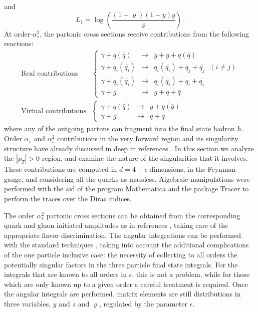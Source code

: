 \documentclass[superscriptaddress,showkeys,showpacs]{revtex4}
\begin{document}
and
\begin{equation}
L_1=\log\left( \frac{(1-\varrho)(1-y) y}{\varrho}\right) \, .
\end{equation}
At order-$\alpha_s^2$, the partonic cross sections receive contributions from the 
following  
reactions:
\begin{equation}\label{eq:partreac}
\begin{array}{ll}
\mbox{Real contributions}&\left\{
\begin{array}{lcl}
\gamma+q(\bar{q})&\rightarrow& g+g+q(\bar{q})\\
\gamma+q_{i}(\bar{q_{i}})&\rightarrow&q_{i}(\bar{q_{i}})+q_{j}+\bar{q_{j}}
\,\,\,\,(i\neq j)\\
 \gamma+q_{i}(\bar{q_{i}})&\rightarrow&q_{i}(\bar{q_{i}})+q_{i}+\bar{q_{i}}\\
\gamma+g&\rightarrow& g+q+\bar{q}
\end{array}
\right.\\
\mbox{Virtual contributions}&\left\{
\begin{array}{lcl}
\gamma+q(\bar{q})&\rightarrow& g+ q(\bar{q})\\
\gamma+g&\rightarrow& q+\bar{q}
\end{array}
\right.
\end{array}
\end{equation}
where any of the outgoing partons can fragment into the final state hadron 
$h$. Order $\alpha_s$ and  $\alpha_s^2$ contributions in the very forward
region
and its singularity structure have already discussed in deep in references 
\cite{gluon,quark}. In this section we analyze the  $|p_T|>0$ region, and 
examine 
the nature of the singularities that it involves.  These contributions are 
computed in $d=4+\epsilon$ dimensions, in the Feynman gauge, and considering 
all the quarks as massless. Algebraic manipulations 
were performed with the aid of the program {\sc Mathematica} \cite{math} and 
the package {\sc Tracer} \cite{tracer} to perform the traces over the Dirac 
indices.


The order $\alpha_s^2$ partonic cross sections can be obtained from the 
corresponding
quark and gluon initiated amplitudes as in references \cite{gluon,quark}, 
taking care
of the appropriate flavor discrimination. The angular integrations can be
 performed 
with the standard techniques \cite{ert,been}, taking into account the additional
 complications  
of the one particle inclusive case: the necessity of collecting to all orders
 the potentially 
singular factors in the three particle final state integrals.
For the integrals that are known to all orders in $\epsilon$, 
this is not a problem, while for those which are only known up to a given 
order a careful treatment is required.
Once the angular integrals are performed, matrix elements are still 
distributions in three variables, $y$ and $z$ and $\varrho$, regulated by 
the parameter $\epsilon$.
\end{document}
